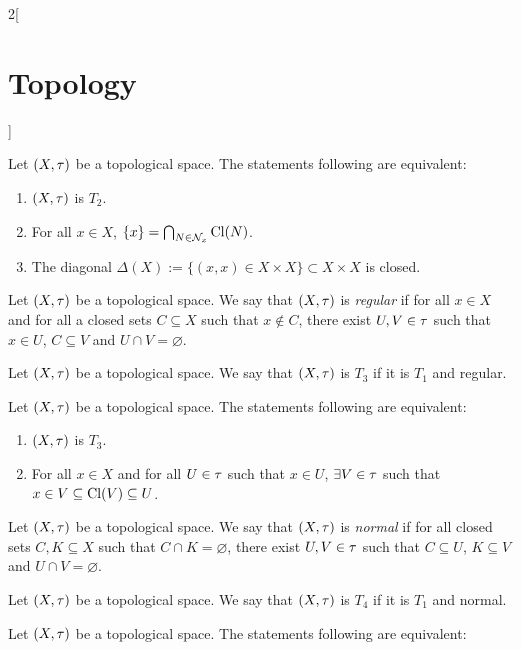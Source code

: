 \documentclass[../../../main.tex]{subfiles}
\begin{document}
\begin{multicols}{2}[\section{Topology}]
    \begin{theorem}
        Let $(X,\tau)$ be a topological space. The statements following are equivalent:
        \begin{enumerate}
            \item $(X,\tau)$ is $T_2$.
            \item For all $x\in X$, $\{x\}=\bigcap_{N\in \mathcal{N}_x}\operatorname{Cl}(N)$.
            \item The diagonal $\Delta(X):=\{(x,x)\in X\times X\}\subset X\times X$ is closed.
        \end{enumerate}
    \end{theorem}
    \begin{definition}
        Let $(X,\tau)$ be a topological space. We say that $(X,\tau)$ is \emph{regular} if for all $x\in X$ and for all a closed sets $C\subseteq X$ such that $x\notin C$, there exist $U,V\in\tau$ such that $x\in U$, $C\subseteq V$ and $U\cap V=\varnothing$.
    \end{definition}
    \begin{definition}[$T_3$ space]
        Let $(X,\tau)$ be a topological space. We say that $(X,\tau)$ is $T_3$ if it is $T_1$ and regular.
    \end{definition}
    \begin{theorem}
        Let $(X,\tau)$ be a topological space. The statements following are equivalent:
        \begin{enumerate}
            \item $(X,\tau)$ is $T_3$.
            \item For all $x\in X$ and for all $U\in\tau$ such that $x\in U$, $\exists V\in\tau$ such that $x\in V\subseteq\operatorname{Cl}(V)\subseteq U$.
        \end{enumerate}
    \end{theorem}
    \begin{definition}
        Let $(X,\tau)$ be a topological space. We say that $(X,\tau)$ is \emph{normal} if for all closed sets $C,K\subseteq X$ such that $C\cap K=\varnothing$, there exist $U,V\in\tau$ such that $C\subseteq U$, $K\subseteq V$ and $U\cap V=\varnothing$.
    \end{definition}
    \begin{definition}[$T_4$ space]
        Let $(X,\tau)$ be a topological space. We say that $(X,\tau)$ is $T_4$ if it is $T_1$ and normal.
    \end{definition}
    \begin{theorem}
        Let $(X,\tau)$ be a topological space. The statements following are equivalent:

\end{theorem}
\end{multicols}
\end{document}
